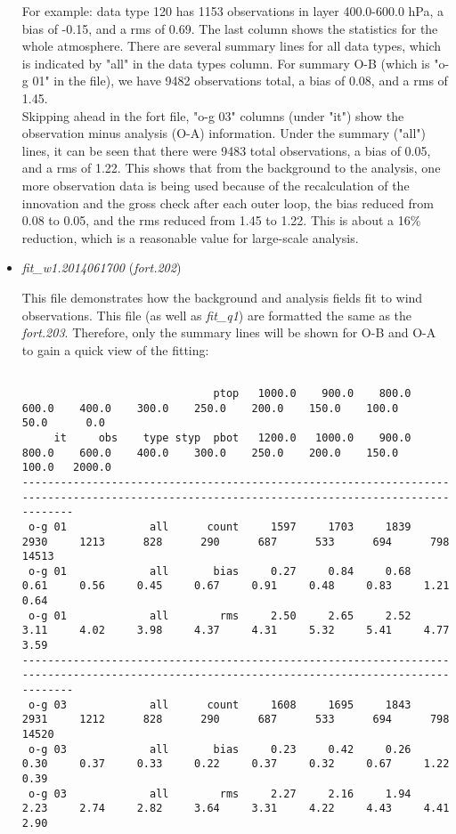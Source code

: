 \begin{itemize}[leftmargin=*]
For example: data type 120 has 1153 observations in layer 400.0-600.0 hPa, a bias of    -0.15, and a rms of 0.69. The last column shows the statistics for the whole atmosphere. There are several summary lines for all data types, which is indicated by "all" in the data types column.  For summary O-B (which is "o-g 01" in the file), we have 9482 observations total, a bias of 0.08, and a rms of 1.45. \\

 Skipping ahead in the fort file, "o-g 03" columns (under "it") show the observation minus analysis (O-A) information.  Under the summary ("all") lines, it can be seen that there were 9483 total observations, a bias of 0.05, and a rms of 1.22.  This shows that from the background to the analysis, one more observation data is being used because of the recalculation of the innovation and the gross check after each outer loop,   the bias reduced from 0.08 to 0.05, and the rms reduced from 1.45 to 1.22.  This is about a 16\% reduction, which is a reasonable value for large-scale analysis. \\
 

\item \textit{fit\_w1.2014061700} (\textit{fort.202})

This file demonstrates how the background and analysis fields fit to wind observations.  This file (as well as \textit{fit\_q1}) are formatted the same as the \textit{fort.203}.  Therefore, only the summary lines will be shown for O-B and O-A to gain a quick view of the fitting:

\begin{tiny}
\begin{verbatim}

                              ptop   1000.0    900.0    800.0    600.0    400.0    300.0    250.0    200.0    150.0    100.0     50.0      0.0
     it     obs    type styp  pbot   1200.0   1000.0    900.0    800.0    600.0    400.0    300.0    250.0    200.0    150.0    100.0   2000.0
----------------------------------------------------------------------------------------------------------------------------------------------
 o-g 01             all      count     1597     1703     1839     2930     1213      828      290      687      533      694      798    14513
 o-g 01             all       bias     0.27     0.84     0.68     0.61     0.56     0.45     0.67     0.91     0.48     0.83     1.21     0.64
 o-g 01             all        rms     2.50     2.65     2.52     3.11     4.02     3.98     4.37     4.31     5.32     5.41     4.77     3.59
----------------------------------------------------------------------------------------------------------------------------------------------
 o-g 03             all      count     1608     1695     1843     2931     1212      828      290      687      533      694      798    14520
 o-g 03             all       bias     0.23     0.42     0.26     0.30     0.37     0.33     0.22     0.37     0.32     0.67     1.22     0.39
 o-g 03             all        rms     2.27     2.16     1.94     2.23     2.74     2.82     3.64     3.31     4.22     4.43     4.41     2.90


\end{verbatim}
\end{tiny}
\end{itemize}
